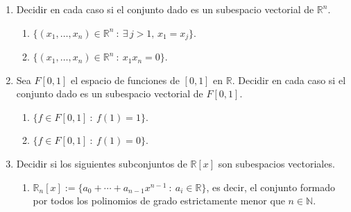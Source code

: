 \begin{enumerate}[resume, topsep=6pt, itemsep=.4cm]

\item Decidir en cada caso si el conjunto dado es un subespacio vectorial de $\mathbb{R}^{n}$.
    \begin{enumerate}
        \item $\{(x_1, \ldots ,x_n) \in \mathbb{R}^n \ : \ \exists \, j > 1, \, x_1 = x_j\}$.
        \item $\{(x_1, \ldots , x_n) \in\mathbb{R}^n \ : \ x_1x_n = 0 \}$.
    \end{enumerate}


\item\label{sub funciones} Sea $F[0,1]$ el espacio de funciones de $[0,1]$ en $\mathbb{R}$. Decidir en cada caso si el conjunto dado es un subespacio vectorial de $F[0,1]$.
    \begin{enumerate}
    \item\label{sub funciones 1} $\{ f \in F[0,1] \ : \ f(1) = 1 \}$.
    \item\label{sub funciones 0} $\{ f \in F[0,1] \ : \ f(1) = 0\}$.
\end{enumerate}
    
    \item\label{sub polinomios} Decidir si los siguientes subconjuntos de $\mathbb{R}[x]$ son subespacios vectoriales.

    \begin{enumerate}
     \item $\mathbb{R}_{n}[x] := \{ a_0 + \cdots + a_{n-1}x^{n-1} \ : \ a_i \in \mathbb{R}\}$, es decir, el conjunto formado por todos los polinomios de grado estrictamente menor que $n\in\mathbb{N}$.


\end{enumerate}
\end{enumerate}
